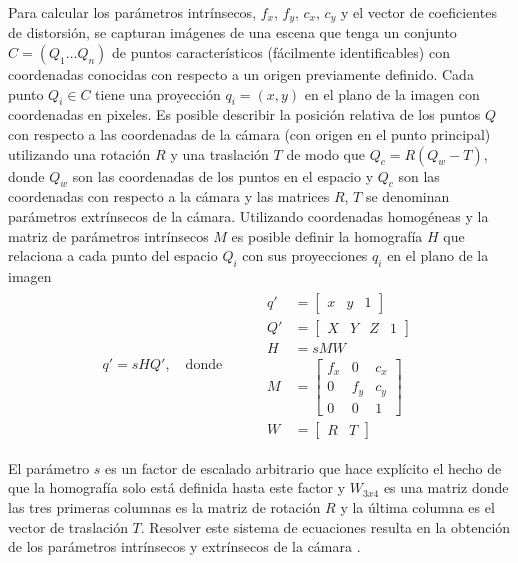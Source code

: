 Para calcular los parámetros intrínsecos, $f_x$, $f_y$, $c_x$, $c_y$ y el vector de coeficientes de distorsión, se capturan imágenes de una escena que tenga un conjunto $C=(Q_1 \dots Q_n)$ de puntos característicos (fácilmente identificables) con coordenadas conocidas con respecto a un origen previamente definido. Cada punto $Q_i\in{C}$ tiene una proyección $q_i=(x, y)$ en el plano de la imagen con coordenadas en pixeles. Es posible describir la posición relativa de los puntos $Q$ con respecto a las coordenadas de la cámara (con origen en el punto principal) utilizando una rotación $R$ y una traslación $T$ de modo que $Q_c=R(Q_w-T)$, donde $Q_w$ son las coordenadas de los puntos en el espacio y $Q_c$ son las coordenadas con respecto a la cámara y las matrices $R$, $T$ se denominan parámetros extrínsecos de la cámara. Utilizando coordenadas homogéneas y la matriz de parámetros intrínsecos $M$ es posible definir la homografía $H$ que relaciona a cada punto del espacio $Q_i$ con sus proyecciones $q_i$ en el plano de la imagen \cite{David}
\begin{equation*}
    \begin{split}
        q'=sHQ',\quad\text{donde}\qquad &
        \begin{split}
            q' & = \begin{bmatrix}x&y&1\end{bmatrix}\\
            Q' & = \begin{bmatrix}X&Y&Z&1\end{bmatrix}\\
            H & = sMW\\
            M & = \begin{bmatrix}
	            f_x & 0 & c_x \\
	            0 & f_y & c_y \\
	            0 & 0 & 1
                \end{bmatrix}\\
            W & = \begin{bmatrix}R&T\end{bmatrix}
        \end{split}
    \end{split}
\end{equation*}

El parámetro $s$ es un factor de escalado arbitrario que hace explícito el hecho de que la homografía solo está definida hasta este factor y $W_{3x4}$ es una matriz donde las tres primeras columnas es la matriz de rotación $R$ y la última columna es el vector de traslación $T$. Resolver este sistema de ecuaciones resulta en la obtención de los parámetros intrínsecos y extrínsecos de la cámara \cite{David}.


